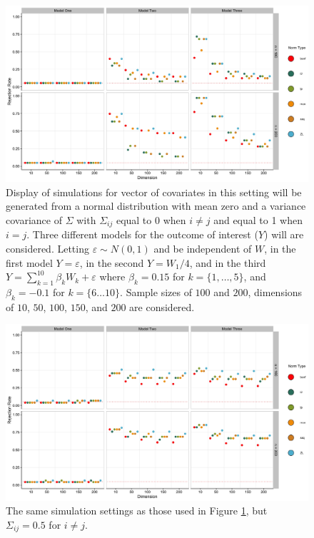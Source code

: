 \documentclass{article}
\begin{document}

\begin{figure}[]
	\centering
\includegraphics[width = \linewidth]{uncor.jpg}
	\caption{Display of simulations for vector of covariates in this setting will be generated from a normal distribution with mean zero and a variance covariance of $\Sigma$ with $\Sigma_{ij}$ equal to $0$ when $i \neq j$ and equal to 1 when $i = j$. Three different models for the outcome of interest ($Y$) will are considered. Letting $\varepsilon \sim N(0, 1)$ and be independent of $W$, in the first model $Y = \varepsilon$, in the second $Y = W_1 / 4$, and in the third $Y = \sum_{k = 1}^{10} \beta_k W_k + \varepsilon$ where $\beta_k = 0.15$ for $k = \{1, \dots, 5\}$, and $\beta_k = -0.1$ for $k = \{6 \dots 10\}$. Sample sizes of $100$ and $200$, dimensions of $10$, $50$, $100$, $150$, and $200$ are considered.}
	\label{fig:uncor}
\end{figure}

\begin{figure}[]
	\centering
\includegraphics[width = \linewidth]{some_core.jpg}
	\caption{The same simulation settings as those used in Figure \ref{fig:uncor}, but $\Sigma_{ij} = 0.5$ for $i \neq j$.}
	\label{fig:somecor}
\end{figure}	
\end{document}
